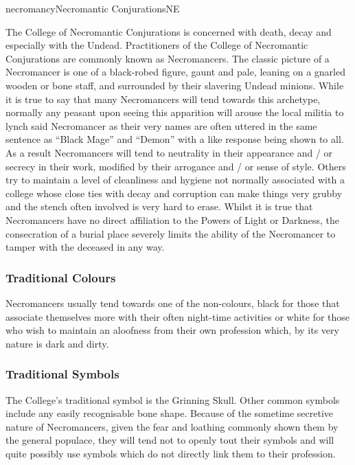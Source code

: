 \begin{College}[1.1]{necromancy}{Necromantic Conjurations}{NE}

The College of Necromantic Conjurations is concerned with death, decay
and especially with the Undead. Practitioners of the College of
Necromantic Conjurations are commonly known as Necromancers.  The
classic picture of a Necromancer is one of a black-robed figure, gaunt
and pale, leaning on a gnarled wooden or bone staff, and surrounded by
their slavering Undead minions. While it is true to say that many
Necromancers will tend towards this archetype, normally any peasant
upon seeing this apparition will arouse the local militia to lynch
said Necromancer as their very names are often uttered in the same
sentence as “Black Mage” and “Demon” with a like response being shown
to all.  As a result Necromancers will tend to neutrality in their
appearance and / or secrecy in their work, modified by their arrogance
and / or sense of style.  Others try to maintain a level of
cleanliness and hygiene not normally associated with a college whose
close ties with decay and corruption can make things very grubby and
the stench often involved is very hard to erase. Whilst it is true
that Necromancers have no direct affiliation to the Powers of Light or
Darkness, the consecration of a burial place severely limits the
ability of the Necromancer to tamper with the deceased in any way.

\subsubsection{Traditional Colours}

Necromancers usually tend towards one of the non-colours, black for
those that associate themselves more with their often night-time
activities or white for those who wish to maintain an aloofness from
their own profession which, by its very nature is dark and dirty.

\subsubsection{Traditional Symbols}

The College’s traditional symbol is the Grinning Skull.  Other common
symbols include any easily recognisable bone shape. Because of the
sometime secretive nature of Necromancers, given the fear and loathing
commonly shown them by the general populace, they will tend not to
openly tout their symbols and will quite possibly use symbols which do
not directly link them to their profession.


\end{College}
